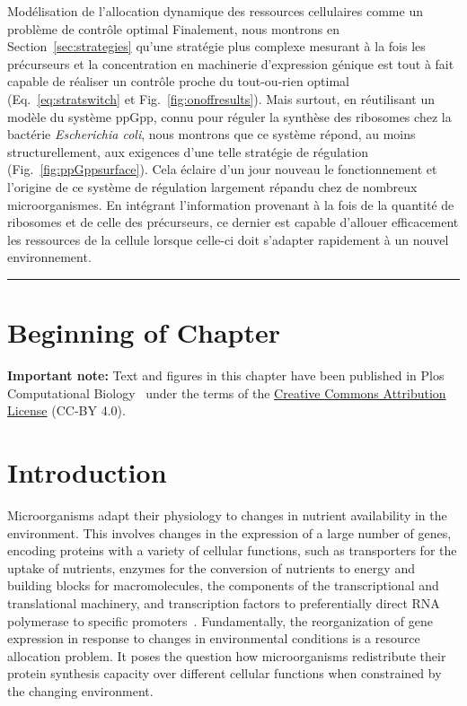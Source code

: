 \begin{chapter_summary}{Modélisation de l'allocation dynamique des ressources cellulaires comme un problème de contrôle optimal}
Finalement, nous montrons en Section~\ref{sec:strategies} qu'une stratégie plus complexe mesurant à la fois les précurseurs et la concentration en machinerie d'expression génique est tout à fait capable de réaliser un contrôle proche du tout-ou-rien optimal (Eq.~\ref{eq:stratswitch} et Fig.~\ref{fig:onoffresults}).
Mais surtout, en réutilisant un modèle du système ppGpp, connu pour réguler la synthèse des ribosomes chez la bactérie \textit{Escherichia coli}, nous montrons que ce système répond, au moins structurellement, aux exigences d'une telle stratégie de régulation (Fig.~\ref{fig:ppGppsurface}).
Cela éclaire d'un jour nouveau le fonctionnement et l'origine de ce système de régulation largement répandu chez de nombreux microorganismes.
En intégrant l'information provenant à la fois de la quantité de ribosomes et de celle des précurseurs, ce dernier est capable d'allouer efficacement les ressources de la cellule lorsque celle-ci doit s'adapter rapidement à un nouvel environnement.
\end{chapter_summary}

\begin{center}
\noindent\rule{4cm}{0.1pt}
\end{center}

\section*{Beginning of Chapter \thechapter}

\noindent \textbf{Important note:} Text and figures in this chapter have been published in Plos Computational Biology~\cite{giordano_dynamical_2016} under the terms of the \href{https://creativecommons.org/licenses/by/4.0/}{Creative Commons Attribution License} (CC-BY 4.0).

\section{Introduction}

Microorganisms adapt their physiology to changes in nutrient availability in the environment.
This involves changes in the expression of a large number of genes, encoding proteins with a variety of cellular functions, such as transporters for the uptake of nutrients, enzymes for the conversion of nutrients to energy and building blocks for macromolecules, the components of the transcriptional and translational machinery, and transcription factors to preferentially direct RNA polymerase to specific promoters~\cite{schaechter_microbe_2006,keseler_ecocyc_2013}.
Fundamentally, the reorganization of gene expression in response to changes in environmental conditions is a resource allocation problem.
It poses the question how microorganisms redistribute their protein synthesis capacity over different cellular functions when constrained by the changing environment.

